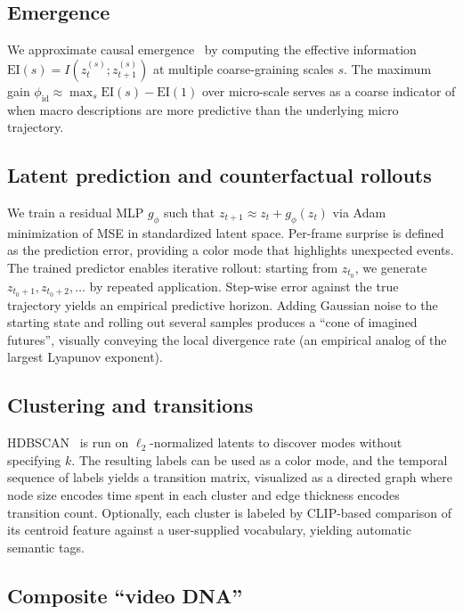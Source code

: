 \documentclass[11pt,a4paper]{article}
\begin{document}
\subsection{Emergence}

We approximate causal emergence~\cite{hoel2013quantifying} by
computing the effective information
$\mathrm{EI}(s) = I(z_t^{(s)}; z_{t+1}^{(s)})$ at multiple
coarse-graining scales $s$. The maximum gain
$\phi_{\text{id}} \approx \max_s \mathrm{EI}(s) - \mathrm{EI}(1)$
over micro-scale serves as a coarse indicator of when macro
descriptions are more predictive than the underlying micro
trajectory.

\subsection{Latent prediction and counterfactual rollouts}

We train a residual MLP $g_\phi$ such that
$z_{t+1} \approx z_t + g_\phi(z_t)$ via Adam minimization of MSE in
standardized latent space. Per-frame surprise is defined as the
prediction error, providing a color mode that highlights unexpected
events. The trained predictor enables iterative rollout: starting
from $z_{t_0}$, we generate $z_{t_0+1}, z_{t_0+2}, \dots$ by repeated
application. Step-wise error against the true trajectory yields an
empirical predictive horizon. Adding Gaussian noise to the starting
state and rolling out several samples produces a ``cone of imagined
futures'', visually conveying the local divergence rate (an
empirical analog of the largest Lyapunov exponent).

\subsection{Clustering and transitions}

HDBSCAN~\cite{campello2013hdbscan} is run on $\ell_2$-normalized
latents to discover modes without specifying $k$. The resulting
labels can be used as a color mode, and the temporal sequence of
labels yields a transition matrix, visualized as a directed graph
where node size encodes time spent in each cluster and edge
thickness encodes transition count. Optionally, each cluster is
labeled by CLIP-based comparison of its centroid feature against a
user-supplied vocabulary, yielding automatic semantic tags.

\subsection{Composite ``video DNA''}
\end{document}
